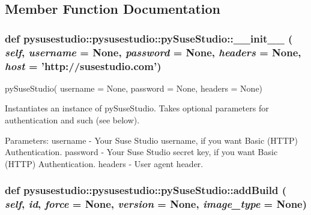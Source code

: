 \subsection{Member Function Documentation}
\hypertarget{classpysusestudio_1_1pysusestudio_1_1py_suse_studio_a21298bd7976506411c13c37287c939a4}{
\subsubsection[{\_\-\_\-init\_\-\_\-}]{\setlength{\rightskip}{0pt plus 5cm}def pysusestudio::pysusestudio::pySuseStudio::\_\-\_\-init\_\-\_\- ( {\em self}, \/   {\em username} = {\ttfamily None}, \/   {\em password} = {\ttfamily None}, \/   {\em headers} = {\ttfamily None}, \/   {\em host} = {\ttfamily 'http://susestudio.com'})}}
\label{classpysusestudio_1_1pysusestudio_1_1py_suse_studio_a21298bd7976506411c13c37287c939a4}
\begin{DoxyVerb}pySuseStudio( username = None, password = None, headers = None)

        Instantiates an instance of pySuseStudio. Takes optional parameters for authentication and such (see below).

        Parameters:
username - Your Suse Studio username, if you want Basic (HTTP) Authentication.
password - Your Suse Studio secret key, if you want Basic (HTTP) Authentication.
headers - User agent header.
\end{DoxyVerb}
 \hypertarget{classpysusestudio_1_1pysusestudio_1_1py_suse_studio_a8d4ee7f67755d71cf05d5786396f0beb}{
\subsubsection[{addBuild}]{\setlength{\rightskip}{0pt plus 5cm}def pysusestudio::pysusestudio::pySuseStudio::addBuild ( {\em self}, \/   {\em id}, \/   {\em force} = {\ttfamily None}, \/   {\em version} = {\ttfamily None}, \/   {\em image\_\-type} = {\ttfamily None})}}
\label{classpysusestudio_1_1pysusestudio_1_1py_suse_studio_a8d4ee7f67755d71cf05d5786396f0beb}
